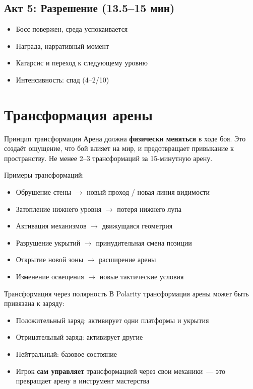 \documentclass[a4paper,11pt]{report}
\begin{document}
\subsection{Акт 5: Разрешение (13.5--15 мин)}

\begin{itemize}[leftmargin=*]
  \item Босс повержен, среда успокаивается
  \item Награда, нарративный момент
  \item Катарсис и переход к следующему уровню
  \item Интенсивность: спад (4--2/10)
\end{itemize}

\section{Трансформация арены}

\begin{principle}{Принцип трансформации}
Арена должна \textbf{физически меняться} в ходе боя. Это создаёт
ощущение, что бой влияет на мир, и предотвращает привыкание
к пространству. Не менее 2--3 трансформаций за 15-минутную арену.
\end{principle}

Примеры трансформаций:
\begin{itemize}[leftmargin=*]
  \item Обрушение стены $\to$ новый проход / новая линия видимости
  \item Затопление нижнего уровня $\to$ потеря нижнего лупа
  \item Активация механизмов $\to$ движущаяся геометрия
  \item Разрушение укрытий $\to$ принудительная смена позиции
  \item Открытие новой зоны $\to$ расширение арены
  \item Изменение освещения $\to$ новые тактические условия
\end{itemize}

\begin{polarity}{Трансформация через полярность}
В Polarity трансформация арены может быть привязана к заряду:
\begin{itemize}
  \item Положительный заряд: активирует одни платформы и укрытия
  \item Отрицательный заряд: активирует другие
  \item Нейтральный: базовое состояние
  \item Игрок \textbf{сам управляет} трансформацией через свои
    механики~--- это превращает арену в инструмент мастерства
\end{itemize}
\end{polarity}
\end{document}
